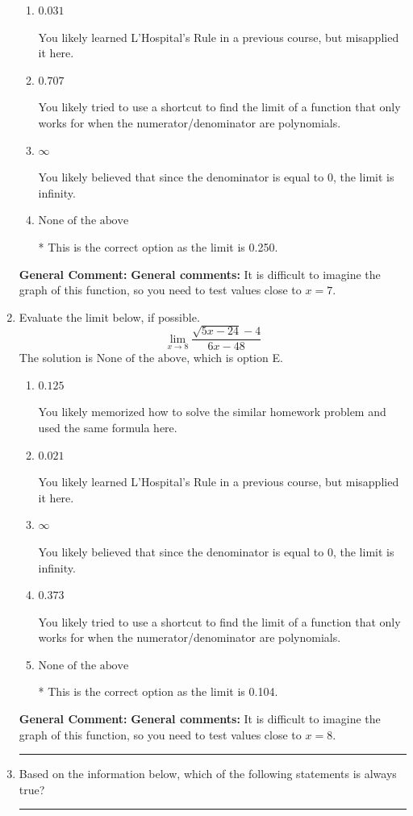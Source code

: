 \documentclass{extbook}[14pt]
\newcommand{\litem}[1]{\item #1

\rule{\textwidth}{0.4pt}}
\begin{document}
\begin{enumerate}
{\begin{enumerate}[label=\Alph*.]
You likely memorized how to solve the similar homework problem and used the same formula here.
\item \( 0.031 \)

You likely learned L'Hospital's Rule in a previous course, but misapplied it here.
\item \( 0.707 \)

You likely tried to use a shortcut to find the limit of a function that only works for when the numerator/denominator are polynomials.
\item \( \infty \)

You likely believed that since the denominator is equal to 0, the limit is infinity.
\item \( \text{None of the above} \)

* This is the correct option as the limit is 0.250.
\end{enumerate}

\textbf{General Comment:} \textbf{General comments:} It is difficult to imagine the graph of this function, so you need to test values close to $x = 7$.
}
\litem{
Evaluate the limit below, if possible.
\[ \lim_{x \rightarrow 8} \frac{\sqrt{5x - 24} - 4}{6x - 48} \]The solution is \( \text{None of the above} \), which is option E.\begin{enumerate}[label=\Alph*.]
\item \( 0.125 \)

You likely memorized how to solve the similar homework problem and used the same formula here.
\item \( 0.021 \)

You likely learned L'Hospital's Rule in a previous course, but misapplied it here.
\item \( \infty \)

You likely believed that since the denominator is equal to 0, the limit is infinity.
\item \( 0.373 \)

You likely tried to use a shortcut to find the limit of a function that only works for when the numerator/denominator are polynomials.
\item \( \text{None of the above} \)

* This is the correct option as the limit is 0.104.
\end{enumerate}

\textbf{General Comment:} \textbf{General comments:} It is difficult to imagine the graph of this function, so you need to test values close to $x = 8$.
}
\litem{
Based on the information below, which of the following statements is always true?

}
\end{enumerate}
\end{document}
